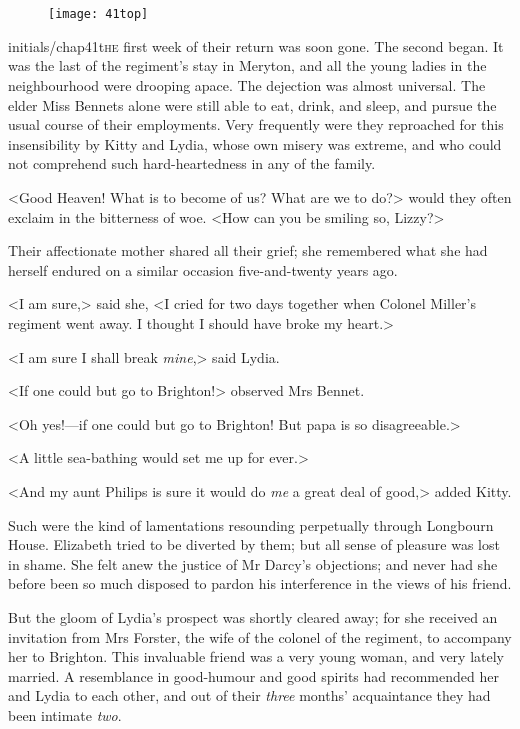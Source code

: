 \chapter[Chapter \thechapter]{}
	
	
\begin{figure}[t!]
\centering
\texttt{[image: 41top]}
\end{figure}


\lettrine[lines=6,image=true]{initials/chap41t}{he}  first week of their return was soon gone. The second began. It was the last of the regiment's stay in Meryton, and all the young ladies in the neighbourhood were drooping apace. The dejection was almost universal. The elder Miss Bennets alone were still able to eat, drink, and sleep, and pursue the usual course of their employments. Very frequently were they reproached for this insensibility by Kitty and Lydia, whose own misery was extreme, and who could not comprehend such hard-heartedness in any of the family.

<Good Heaven! What is to become of us? What are we to do?> would they often exclaim in the bitterness of woe. <How can you be smiling so, Lizzy?>

Their affectionate mother shared all their grief; she remembered what she had herself endured on a similar occasion five-and-twenty years ago.

<I am sure,> said she, <I cried for two days together when Colonel Miller's regiment went away. I thought I should have broke my heart.>

<I am sure I shall break \textit{mine},> said Lydia.

<If one could but go to Brighton!> observed Mrs Bennet.

<Oh yes!—if one could but go to Brighton! But papa is so disagreeable.>

<A little sea-bathing would set me up for ever.>

<And my aunt Philips is sure it would do \textit{me} a great deal of good,> added Kitty.

Such were the kind of lamentations resounding perpetually through Longbourn House. Elizabeth tried to be diverted by them; but all sense of pleasure was lost in shame. She felt anew the justice of Mr Darcy's objections; and never had she before been so much disposed to pardon his interference in the views of his friend.

But the gloom of Lydia's prospect was shortly cleared away; for she received an invitation from Mrs Forster, the wife of the colonel of the regiment, to accompany her to Brighton. This invaluable friend was a very young woman, and very lately married. A resemblance in good-humour and good spirits had recommended her and Lydia to each other, and out of their \textit{three} months' acquaintance they had been intimate \textit{two}.

